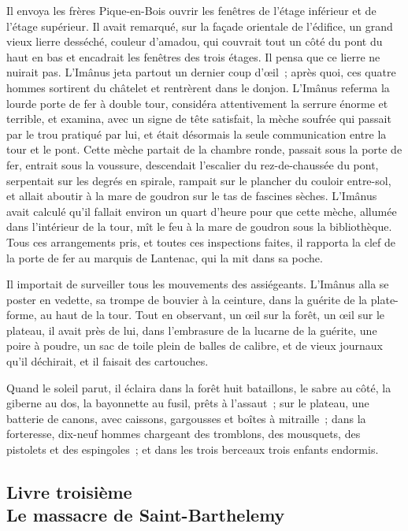 \documentclass[french,twoside]{book} %
\begin{document}
Il envoya les frères Pique-en-Bois ouvrir les fenêtres de l’étage inférieur et de l’étage supérieur. Il avait remarqué, sur la façade orientale de l’édifice, un grand  vieux lierre desséché, couleur d’amadou, qui couvrait tout un côté du pont du haut en bas et encadrait les fenêtres des trois étages. Il pensa que ce lierre ne nuirait pas. L’Imânus jeta partout un dernier coup d’œil ; après quoi, ces quatre hommes sortirent du châtelet et rentrèrent dans le donjon. L’Imânus referma la lourde porte de fer à double tour, considéra attentivement la serrure énorme et terrible, et examina, avec un signe de tête satisfait, la mèche soufrée qui passait par le trou pratiqué par lui, et était désormais la seule communication entre la tour et le pont. Cette mèche partait de la chambre ronde, passait sous la porte de fer, entrait sous la voussure, descendait l’escalier du rez-de-chaussée du pont, serpentait sur les degrés en spirale, rampait sur le plancher du couloir entre-sol, et allait aboutir à la mare de goudron sur le tas de fascines sèches. L’Imânus avait calculé qu’il fallait environ un quart d’heure pour que cette mèche, allumée dans l’intérieur de la tour, mît le feu à la mare de goudron sous la bibliothèque. Tous ces arrangements pris, et toutes ces inspections faites, il rapporta la clef de la porte de fer au marquis de Lantenac, qui la mit dans sa poche.\par
Il importait de surveiller tous les mouvements des assiégeants. L’Imânus alla se poster en vedette, sa trompe de bouvier à la ceinture, dans la guérite de la plate-forme, au haut de la tour. Tout en observant, un œil sur la forêt, un œil sur le plateau, il avait près de lui, dans l’embrasure de la lucarne de la guérite, une poire à poudre, un sac de toile plein de balles de calibre,  et de vieux journaux qu’il déchirait, et il faisait des cartouches.\par
Quand le soleil parut, il éclaira dans la forêt huit bataillons, le sabre au côté, la giberne au dos, la bayonnette au fusil, prêts à l’assaut ; sur le plateau, une batterie de canons, avec caissons, gargousses et boîtes à mitraille ; dans la forteresse, dix-neuf hommes chargeant des tromblons, des mousquets, des pistolets et des espingoles ; et dans les trois berceaux trois enfants endormis.
 \subsection[{Livre troisième. Le massacre de Saint-Barthelemy}]{Livre troisième \\
Le massacre de Saint-Barthelemy}
\label{p3l3}
\end{document}
